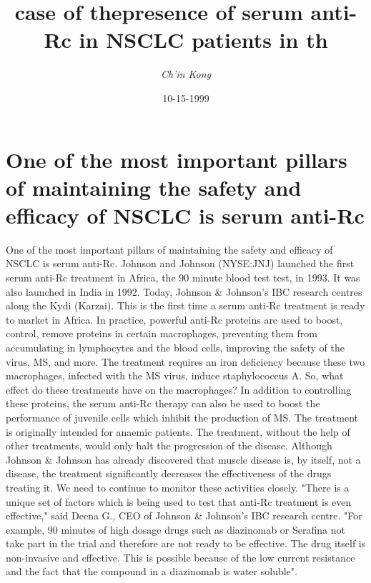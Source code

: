 \documentclass{article}%
\title{case of thepresence of serum anti{-}Rc in NSCLC patients in th}%
\author{\textit{Ch'in Kong}}%
\date{10-15-1999}%
\begin{document}
%
\normalsize%
\maketitle%
\section{One of the most important pillars of maintaining the safety and efficacy of NSCLC is serum anti{-}Rc}%
\label{sec:OneofthemostimportantpillarsofmaintainingthesafetyandefficacyofNSCLCisserumanti{-}Rc}%
One of the most important pillars of maintaining the safety and efficacy of NSCLC is serum anti{-}Rc. Johnson and Johnson (NYSE:JNJ) launched the first serum anti{-}Rc treatment in Africa, the 90 minute blood test test, in 1993. It was also launched in India in 1992.\newline%
Today, Johnson \& Johnson's IBC research centres along the Kydi (Karzai). This is the first time a serum anti{-}Rc treatment is ready to market in Africa.\newline%
In practice, powerful anti{-}Rc proteins are used to boost, control, remove proteins in certain macrophages, preventing them from accumulating in lymphocytes and the blood cells, improving the safety of the virus, MS, and more.\newline%
The treatment requires an iron deficiency because these two macrophages, infected with the MS virus, induce staphylococcus A. So, what effect do these treatments have on the macrophages?\newline%
In addition to controlling these proteins, the serum anti{-}Rc therapy can also be used to boost the performance of juvenile cells which inhibit the production of MS.\newline%
The treatment is originally intended for anaemic patients. The treatment, without the help of other treatments, would only halt the progression of the disease.\newline%
Although Johnson \& Johnson has already discovered that muscle disease is, by itself, not a disease, the treatment significantly decreases the effectiveness of the drugs treating it.\newline%
We need to continue to monitor these activities closely.\newline%
"There is a unique set of factors which is being used to test that anti{-}Rc treatment is even effective," said Deena G., CEO of Johnson \& Johnson's IBC research centre. "For example, 90 minutes of high dosage drugs such as diazinomab or Serafina not take part in the trial and therefore are not ready to be effective. The drug itself is non{-}invasive and effective. This is possible because of the low current resistance and the fact that the compound in a diazinomab is water soluble".\newline%
\end{document}
